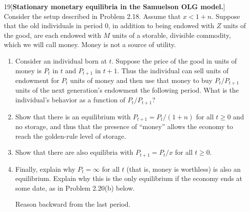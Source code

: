 \begin{problem}{19}[\textbf{Stationary monetary equilibria in the Samuelson OLG model.}]
Consider the setup described in Problem 2.18. Assume that \(x<1+n\). Suppose that the old individuals in period 0, in addition to being endowed with \(Z\) units of the good, are each endowed with \(M\) units of a storable, divisible commodity, which we will call money. Money is not a source of utility.
\begin{enumerate}[label=(\alph*)]
    \item Consider an individual born at \(t\). Suppose the price of the good in units of money is \(P_t\) in \(t\) and \(P_{t+1}\) in \(t+1\). Thus the individual can sell units of endowment for \(P_t\) units of money and then use that money to buy \(P_t/P_{t+1}\) units of the next generation's endowment the following period. What is the individual's behavior as a function of \(P_t/P_{t+1}\)?
    \item Show that there is an equilibrium with \(P_{t+1}=P_t/\left(1+n\right)\) for all \(t\ge0\) and no storage, and thus that the presence of ``money'' allows the economy to reach the golden-rule level of storage.
    \item Show that there are also equilibria with \(P_{t+1}=P_t/x\) for all \(t\ge0\).
    \item Finally, explain why \(P_t=\infty\) for all \(t\) (that is, money is worthless) is also an equilibrium. Explain why this is the only equilibrium if the economy ends at some date, as in Problem 2.20(b) below. \par {} Reason backward from the last period.
\end{enumerate}
\end{problem}

